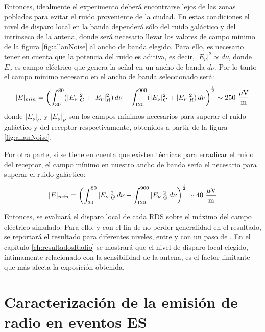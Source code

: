 	Entonces, idealmente el experimento deber\'a encontrarse lejos de las zonas pobladas para evitar el ruido proveniente de la ciudad.
	En estas condiciones el nivel de disparo local en la banda  depender\'a s\'olo del ruido gal\'actico y del intr\'inseco de la antena, donde ser\'a necesario llevar los valores de campo m\'inimo de la figura \ref{fig:allanNoise} al ancho de banda elegido.
	Para ello, es necesario tener en cuenta que la potencia del ruido es aditiva, es decir, $|E_\nu|^2\propto d\nu$, donde $E_\nu$ es campo el\'ectrico que genera la se\~nal en un ancho de banda $d\nu$.
	Por lo tanto el campo m\'inimo necesario en el ancho de banda seleccionado ser\'a:
	\begin{equation}
	|E|_{min}=\left(\int_{30}^{80}(|E_\nu|^2_G+|E_\nu|^2_R)\,d\nu+
	\int_{120}^{900}(|E_\nu|^2_G+|E_\nu|^2_R)\,d\nu
	\right)^\frac{1}{2}
	\sim 250 {\rm\ \dfrac{\mu V}{m}}
	\end{equation}
	donde $|E_\nu|_G$ y $|E_\nu|_R$ son los campos m\'inimos necesarios para superar el ruido gal\'actico y del receptor respectivamente, obtenidos a partir de la figura \ref{fig:allanNoise}.
	
	Por otra parte, si se tiene en cuenta que existen t\'ecnicas para erradicar el ruido del receptor, el campo m\'inimo en nuestro ancho de banda ser\'ia el necesario para superar el ruido gal\'actico:
	\begin{equation}
	|E|_{min}=\left(\int_{30}^{80}|E_\nu|^2_G \,d\nu+
	\int_{120}^{900}|E_\nu|^2_G\, d\nu
	\right)^\frac{1}{2}
	\sim 40 {\rm\ \dfrac{\mu V}{m}}
	\end{equation}
	
	Entonces, se evaluar\'a el disparo local de cada RDS sobre el m\'aximo del campo el\'ectrico simulado.
	Para ello, y con el fin de no perder generalidad en el resultado, se reportar\'a el resultado para diferentes niveles, entre  y  con un paso de .
	En el cap\'itulo \ref{ch:resultadosRadio} se mostrar\'a que el nivel de disparo local elegido, \'intimamente relacionado con la sensibilidad de la antena, es el factor limitante que m\'as afecta la exposici\'on obtenida.
	

\chapter{Caracterizaci\'on de la emisi\'on de radio en eventos ES}
\label{ch:caracterizacionRadio}


